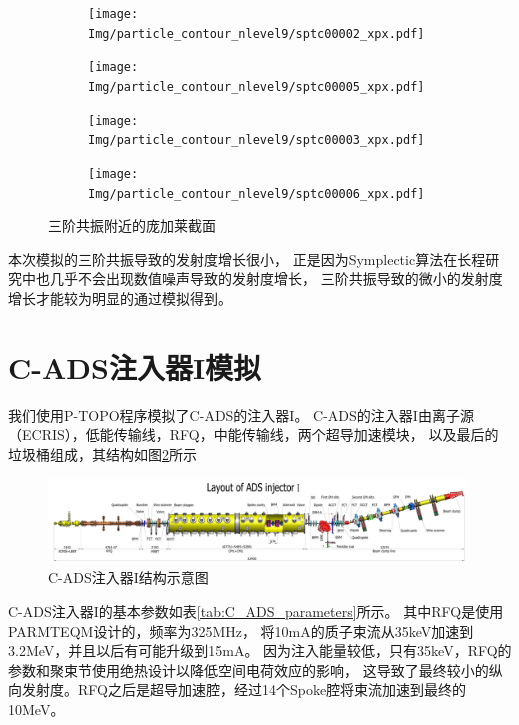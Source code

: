 \begin{figure}[!htb]
    \centering
    \begin{subfigure}[b]{0.48\textwidth}
        \texttt{[image: Img/particle\_contour\_nlevel9/sptc00002\_xpx.pdf]}
        \caption{}
    \end{subfigure}
    \begin{subfigure}[b]{0.48\textwidth}
        \texttt{[image: Img/particle\_contour\_nlevel9/sptc00005\_xpx.pdf]}
        \caption{}
    \end{subfigure}
    \begin{subfigure}[b]{0.48\textwidth}
        \texttt{[image: Img/particle\_contour\_nlevel9/sptc00003\_xpx.pdf]}
        \caption{}
    \end{subfigure}
    \begin{subfigure}[b]{0.48\textwidth}
        \texttt{[image: Img/particle\_contour\_nlevel9/sptc00006\_xpx.pdf]}
        \caption{}
    \end{subfigure}
    \caption{三阶共振附近的庞加莱截面}\label{fig:Poincare}
\end{figure}
本次模拟的三阶共振导致的发射度增长很小，
正是因为Symplectic算法在长程研究中也几乎不会出现数值噪声导致的发射度增长，
三阶共振导致的微小的发射度增长才能较为明显的通过模拟得到。

\section{C-ADS注入器I模拟}        \label{section:ADS_simulation}
我们使用P-TOPO程序模拟了C-ADS的注入器I。
C-ADS的注入器I由离子源（ECRIS），低能传输线，RFQ，中能传输线，两个超导加速模块，
以及最后的垃圾桶组成，其结构如图\ref{fig:ADS_layout}所示

\begin{figure}[!htb]
    \centering
    \includegraphics[width=0.99\textwidth]{Img/Layout_of_ADS_Injector_I.jpg}
    \caption{C-ADS注入器I结构示意图}
    \label{fig:ADS_layout}
\end{figure}

C-ADS注入器I的基本参数如表\ref{tab:C_ADS_parameters}所示。
其中RFQ是使用PARMTEQM\cite{crandall1998rfq}设计的，频率为325MHz，
将10mA的质子束流从35keV加速到3.2MeV，并且以后有可能升级到15mA。
因为注入能量较低，只有35keV，RFQ的参数和聚束节使用绝热设计以降低空间电荷效应的影响，
这导致了最终较小的纵向发射度。RFQ之后是超导加速腔，经过14个Spoke腔将束流加速到最终的10MeV。

